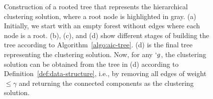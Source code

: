 \begin{figure}[t]
	\vspace{.5cm}
	\begin{minipage}[t]{.4\linewidth}
		\centering
		 \label{fig:T*}
		\label{fig:tree2}
	\end{minipage}
	\begin{minipage}[t]{.4\linewidth}
		\centering
		 \label{fig:T*}
		\label{fig:tree3}
	\end{minipage}
	\caption{
		Construction of a rooted tree that represents the hierarchical clustering solution, where a root node is
		highlighted in gray. (a) Initially, we start with an empty forest without edges where each node is a root. (b), (c), and (d) show different stages of building the tree according to
		Algorithm~\ref{algo:aic-tree}. (d) is the final tree representing the clustering solution. Now,
		for any $`g$, the clustering solution can be obtained from the tree in (d) according to Definition~\ref{def:data-structure}, i.e., by removing all
		edges of weight $\leq \gamma$ and returning the connected components as the clustering
		solution. 
	}
	\label{fig:eg-data}
\end{figure}
